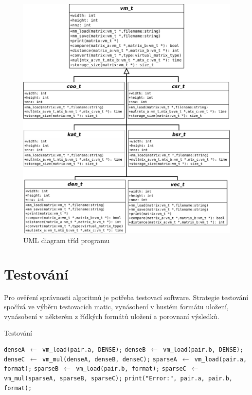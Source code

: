 \begin{figure}[H]
	\includegraphics[width=1.0\textwidth]{./images/uml/uml}
	\caption{UML diagram tříd programu}
	\label{fig:uml}
\end{figure}

\section{Testování}

Pro ověření správnosti algoritmů je potřeba testovací software. Strategie testování spočívá ve výběru testovacích matic, vynásobení v hustém formátu uložení, vynásobení v některém z řídkých formátů uložení a porovnaní výsledků.

\begin{algorithm}[H]
	\caption{Testování}\label{testing}
	\begin{algorithmic}[1]
				\State \texttt{denseA $\gets$ vm\_load(pair.a, DENSE);}
				\State \texttt{denseB $\gets$ vm\_load(pair.b, DENSE);}
				\State \texttt{denseC $\gets$ vm\_mul(denseA, denseB, denseC);}
				\State \texttt{sparseA $\gets$ vm\_load(pair.a, format);}
				\State \texttt{sparseB $\gets$ vm\_load(pair.b, format);}
				\State \texttt{sparseC $\gets$ vm\_mul(sparseA, sparseB, sparseC);}
					\State \texttt{print("Error:", pair.a, pair.b, format);}
				\EndIf
			\EndFor
		\EndFor
		\EndProcedure
	\end{algorithmic}
\end{algorithm}

